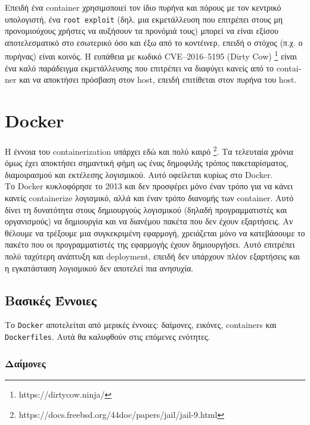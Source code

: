 Επειδή ένα \textlatin{container} χρησιμοποιεί τον ίδιο πυρήνα και πόρους με
τον κεντρικό υπολογιστή, ένα
\texttt{\textlatin{root exploit}} (δηλ. μια εκμετάλλευση που επιτρέπει στους μη
προνομιούχους χρήστες να αυξήσουν τα προνόμιά τους) μπορεί να είναι εξίσου
αποτελεσματικό στο εσωτερικό όσο και έξω από το κοντέινερ, επειδή
ο στόχος (π.χ. ο πυρήνας) είναι κοινός. Η ευπάθεια με κωδικό
\textlatin{CVE–2016–5195 (Dirty Cow)}
\footnote{\textlatin{https://dirtycow.ninja/}} είναι ένα καλό παράδειγμα
εκμετάλλευσης που επιτρέπει να διαφύγει κανείς από το \textlatin{container} και
να αποκτήσει πρόσβαση στον \textlatin{host}, επειδή επιτίθεται στον πυρήνα του
\textlatin{host}. \cite{Dirty-Cow-Escape}


\section{\textlatin{Docker}}

Η έννοια του \textlatin{containerization} υπάρχει εδώ και πολύ καιρό
\footnote{\textlatin{https://docs.freebsd.org/44doc/papers/jail/jail-9.html}}.
Τα τελευταία χρόνια όμως έχει αποκτήσει σημαντική φήμη ως ένας δημοφιλής τρόπος
πακεταρίσματος, διαμοιρασμού και εκτέλεσης λογισμικού. Αυτό οφείλεται κυρίως
στο \textlatin{Docker}. \cite{Docker-Popular} \\

Το \textlatin{Docker} κυκλοφόρησε το 2013 και δεν προσφέρει μόνο έναν τρόπο
για να κάνει κανείς \textlatin{containerize} λογισμικό, αλλά και έναν τρόπο
διανομής των \textlatin{container}. Αυτό δίνει τη δυνατότητα στους δημιουργούς
λογισμικού
(δηλαδή προγραμματιστές και οργανισμούς) να δημιουργία και να διανέμου πακέτα
που δεν έχουν εξαρτήσεις. Αν θέλουμε να τρέξουμε μια συγκεκριμένη εφαρμογή,
χρειάζεται μόνο να κατεβάσουμε το πακέτο που οι προγραμματιστές της
εφαρμογής έχουν δημιουργήσει. Αυτό επιτρέπει πολύ ταχύτερη ανάπτυξη και
\textlatin{deployment}, επειδή δεν υπάρχουν πλέον εξαρτήσεις και η εγκατάσταση
λογισμικού δεν αποτελεί πια ανησυχία.


\subsection{Βασικές Έννοιες}

Το \texttt{\textlatin{Docker}} αποτελείται από μερικές έννοιες: δαίμονες,
εικόνες, \textlatin{containers} και \texttt{\textlatin{Dockerfiles}}. Αυτά θα
καλυφθούν στις επόμενες ενότητες.

\subsubsection{Δαίμονες}

